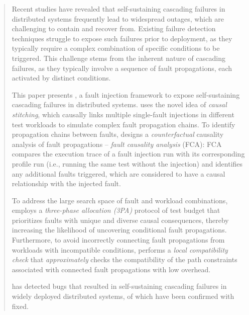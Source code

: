 \begin{abstract}



Recent studies have revealed 
that self-sustaining cascading failures 
in distributed systems 
frequently lead to widespread outages, 
which are challenging to contain and recover from. 
Existing failure detection techniques 
struggle to expose such failures prior to deployment, 
as they typically require a complex combination of specific conditions to be triggered. 
This challenge stems from the inherent nature of cascading failures, 
as they typically involve a sequence of fault propagations, 
each activated by distinct 
conditions. 

This paper presents \tool{}, 
a fault injection 
framework 
to expose self-sustaining
cascading failures in distributed systems. 
\tool{} 
uses the novel idea of \textit{causal stitching}, which causally links multiple single-fault injections 
in different test workloads
to simulate complex fault propagation chains.
To identify propagation chains between faults,
\tool{} designs 
a \textit{counterfactual} causality analysis of fault propagations 
-- \textit{fault causality analysis} (FCA): 
FCA compares the execution trace of a fault injection run 
with its corresponding profile run 
(i.e., running the same test without the injection) 
and identifies any additional faults triggered,
which are considered to have a causal relationship with the
injected fault. 

To address the large search space of fault and workload combinations,  
\tool{} employs a \textit{three-phase allocation (3PA)} protocol of test budget 
that prioritizes faults with unique and diverse causal consequences, 
thereby increasing the likelihood of uncovering conditional fault propagations. 
Furthermore, 
to avoid incorrectly connecting fault propagations from workloads with incompatible conditions, 
\tool{} performs a \textit{local compatibility check} 
that \textit{approximately} 
checks the compatibility of 
the path constraints associated 
with connected fault propagations 
with low overhead. 


\tool{} has detected \NumOfNewVC bugs that 
resulted in self-sustaining 
cascading failures 
in \NumOfSysTested widely deployed distributed systems, 
\NumOfConfirmedVC of which have been confirmed 
with \NumOfFixedVC fixed. 

\end{abstract}